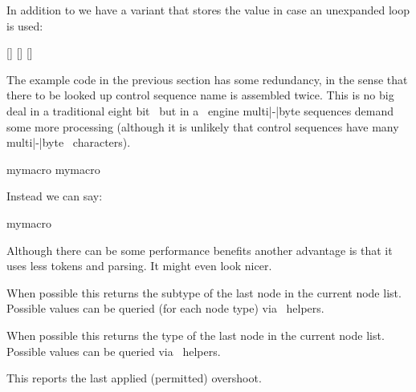 In addition to  we have a variant that stores the value
in case an unexpanded loop is used:

\startbuffer
{} { [\the\currentloopiterator\eq\the\lastloopiterator] }
 { [\the\currentloopiterator\eq\the\lastloopiterator] }
 { [\the\currentloopiterator\ne\the\lastloopiterator] }
\stopbuffer

\typebuffer

\startlines
\getbuffer
\stoplines

\stopnewprimitive

\startnewprimitive[title={\prm {lastnamedcs}}]

The example code in the previous section has some redundancy, in the sense that
there to be looked up control sequence name  is assembled twice.
This is no big deal in a traditional eight bit \TEX\ but in a \UNICODE\ engine
multi|-|byte sequences demand some more processing (although it is unlikely that
control sequences have many multi|-|byte \ characters).

\starttyping
\ifcsname mymacro\endcsname
    \csname mymacro\endcsname
\fi
\stoptyping

Instead we can say:

\starttyping
\ifcsname mymacro\endcsname
    \lastnamedcs
\fi
\stoptyping

Although there can be some performance benefits another advantage is that it uses
less tokens and parsing. It might even look nicer.

\stopnewprimitive

\startnewprimitive[title={\prm {lastnodesubtype}}]

When possible this returns the subtype of the last node in the current node list.
Possible values can be queried (for each node type) via \LUA\ helpers.

\stopnewprimitive

\startoldprimitive[title={\prm {lastnodetype}}]

When possible this returns the type of the last node in the current node list.
Possible values can be queried via \LUA\ helpers.

\stopoldprimitive

\startnewprimitive[title={\prm {lastpageextra}}]

This reports the last applied (permitted) overshoot.

\stopnewprimitive

